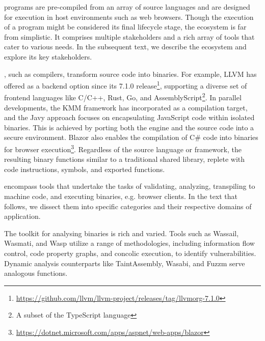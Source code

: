 \label{background:wasm:ecosystems}


\Wasm programs are pre-compiled from an array of source languages and are designed for execution in host environments such as web browsers.
Though the execution of a \Wasm program might be considered its final lifecycle stage, the \Wasm ecosystem is far from simplistic.
It comprises multiple stakeholders and a rich array of tools that cater to various needs.
In the subsequent text, we describe the \Wasm ecosystem and explore its key stakeholders.

, such as compilers, transform source code into \Wasm binaries. 
For example, LLVM has offered \Wasm as a backend option since its 7.1.0 release\footnote{\url{https://github.com/llvm/llvm-project/releases/tag/llvmorg-7.1.0}}, supporting a diverse set of frontend languages like C/C++, Rust, Go, and AssemblyScript\footnote{A subset of the TypeScript language}.
In parallel developments, the KMM framework\cite{kmm} has incorporated \Wasm as a compilation target, and the Javy approach\cite{Javy} focuses on encapsulating JavaScript code within isolated \Wasm binaries. 
This is achieved by porting both the engine and the source code into a secure \Wasm environment. 
Blazor also enables the compilation of C# code into \Wasm binaries for browser execution\footnote{\url{https://dotnet.microsoft.com/apps/aspnet/web-apps/blazor}}.
Regardless of the source language or framework, the resulting \Wasm binary functions similar to a traditional shared library, replete with code instructions, symbols, and exported functions.

 encompass tools that undertake the tasks of validating, analyzing, transpiling to machine code, and executing \Wasm binaries, e.g. browser clients. 
In the text that follows, we dissect them into specific categories and their respective domains of application.

 \cite{WasmA}

 The toolkit for analysing \Wasm binaries is rich and varied. 
Tools such as Wassail\cite{wassail}, Wasmati\cite{wasmati}, and Wasp\cite{Wasp} utilize a range of methodologies, including information flow control, code property graphs, and concolic execution, to identify vulnerabilities. 
Dynamic analysis counterparts like TaintAssembly\cite{taintassembly}, Wasabi\cite{wasabi}, and Fuzzm\cite{fuzzm} serve analogous functions.

